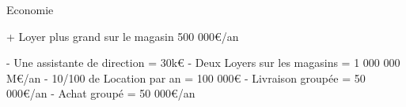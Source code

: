 Economie

+ Loyer plus grand sur le magasin 500 000€/an

- Une assistante de direction = 30k€ 
- Deux Loyers sur les magasins = 1 000 000 M€/an
- 10/100 de Location par an = 100 000€
- Livraison groupée = 50 000€/an
- Achat groupé = 50 000€/an

